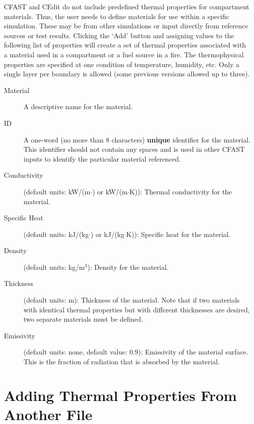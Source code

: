 CFAST and CEdit do not include predefined thermal properties for compartment materials. Thus, the user needs to define materials for use within a specific simulation. These may be from other simulations or input directly from reference sources or test results. Clicking the `Add' button and assigning values to the following list of properties will create a set of thermal properties associated with a material used in a compartment or a fuel source in a fire. The thermophysical properties are specified at one condition of temperature, humidity, etc.  Only a single layer per boundary is allowed (some previous versions allowed up to three).

\begin{description}
\item[Material] A descriptive name for the material.

\item[ID] A one-word (no more than 8 characters) \textbf{unique} identifier for the material.  This identifier should not contain any spaces and is used in other CFAST inputs to identify the particular material referenced.

\item[Conductivity] (default units: kW/(m$\cdot$\degc)  or  kW/(m$\cdot$K)): Thermal conductivity for the material.

\item[Specific Heat] (default units: kJ/(kg$\cdot$\degc) or kJ/(kg$\cdot$K)): Specific heat for the material.

\item[Density] (default units: kg/m$^3$): Density for the material.

\item[Thickness] (default units: m): Thickness of the material.  Note that if two materials with identical thermal properties but with different thicknesses are desired, two separate materials must be defined.

\item[Emissivity] (default units: none, default value: 0.9): Emissivity of the material surface.  This is the fraction of radiation that is absorbed by the material.
\end{description}




\section{Adding Thermal Properties From Another File}

